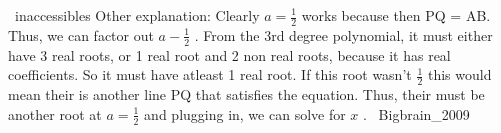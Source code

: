 \documentclass[12pt]{article}
\begin{document}
~inaccessibles Other explanation: Clearly $a=\frac{1}{2}$ works because then PQ = AB. Thus, we can factor out $a-\frac{1}{2}$ . From the 3rd degree polynomial, it must either have 3 real roots, or 1 real root and 2 non real roots, because it has real coefficients. So it must have atleast 1 real root. If this root wasn't $\frac{1}{2}$ this would mean their is another line PQ that satisfies the equation. Thus, their must be another root at $a=\frac{1}{2}$ and plugging in, we can solve for $x$ .
~Bigbrain_2009
\end{document}
